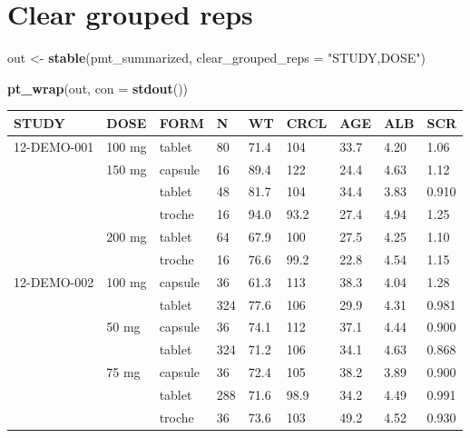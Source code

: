 \documentclass[
]{article}
\newenvironment{Shaded}{\begin{snugshade}}{\end{snugshade}}
\newcommand{\ControlFlowTok}[1]{\textcolor[rgb]{0.13,0.29,0.53}{\textbf{#1}}}
\newcommand{\DataTypeTok}[1]{\textcolor[rgb]{0.13,0.29,0.53}{#1}}
\newcommand{\KeywordTok}[1]{\textcolor[rgb]{0.13,0.29,0.53}{\textbf{#1}}}
\newcommand{\NormalTok}[1]{#1}
\newcommand{\OperatorTok}[1]{\textcolor[rgb]{0.81,0.36,0.00}{\textbf{#1}}}
\newcommand{\StringTok}[1]{\textcolor[rgb]{0.31,0.60,0.02}{#1}}
\begin{document}
\begin{Shaded}
\end{Shaded}

\clearpage

\hypertarget{clear-grouped-reps}{%
\section{Clear grouped reps}\label{clear-grouped-reps}}

\begin{Shaded}
\begin{Highlighting}[]
\NormalTok{out <-}\StringTok{ }\KeywordTok{stable}\NormalTok{(pmt_summarized, }\DataTypeTok{clear_grouped_reps =} \StringTok{"STUDY,DOSE"}\NormalTok{)}

\KeywordTok{pt_wrap}\NormalTok{(out, }\DataTypeTok{con =} \KeywordTok{stdout}\NormalTok{()) }
\end{Highlighting}
\end{Shaded}

\begin{table}[h]
\centering
{\def\arraystretch{1.4}\tabcolsep=5pt
\begin{threeparttable}
\begin{tabular}[h]{lllllllll}
\hline
STUDY & DOSE & FORM & N & WT & CRCL & AGE & ALB & SCR \\
\hline
12-DEMO-001 & 100 mg & tablet & 80 & 71.4 & 104 & 33.7 & 4.20 & 1.06 \\
 & 150 mg & capsule & 16 & 89.4 & 122 & 24.4 & 4.63 & 1.12 \\
 &  & tablet & 48 & 81.7 & 104 & 34.4 & 3.83 & 0.910 \\
 &  & troche & 16 & 94.0 & 93.2 & 27.4 & 4.94 & 1.25 \\
 & 200 mg & tablet & 64 & 67.9 & 100 & 27.5 & 4.25 & 1.10 \\
 &  & troche & 16 & 76.6 & 99.2 & 22.8 & 4.54 & 1.15 \\
12-DEMO-002 & 100 mg & capsule & 36 & 61.3 & 113 & 38.3 & 4.04 & 1.28 \\
 &  & tablet & 324 & 77.6 & 106 & 29.9 & 4.31 & 0.981 \\
 & 50 mg & capsule & 36 & 74.1 & 112 & 37.1 & 4.44 & 0.900 \\
 &  & tablet & 324 & 71.2 & 106 & 34.1 & 4.63 & 0.868 \\
 & 75 mg & capsule & 36 & 72.4 & 105 & 38.2 & 3.89 & 0.900 \\
 &  & tablet & 288 & 71.6 & 98.9 & 34.2 & 4.49 & 0.991 \\
 &  & troche & 36 & 73.6 & 103 & 49.2 & 4.52 & 0.930 \\
\hline
\end{tabular}
\end{threeparttable}
}
\end{table}
\end{document}
